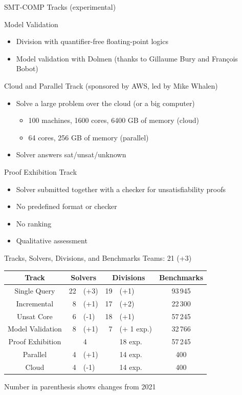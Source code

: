 \documentclass[table]{beamer}
\def\emph#1{\textcolor{MYblue}{#1}}
\begin{document}
\begin{frame}[fragile]{SMT-COMP Tracks (experimental)}

  \emph{Model Validation}
  \begin{itemize}
    \item Division with quantifier-free floating-point logics
    \item Model validation with Dolmen (thanks to Gillaume Bury and Fran\c{c}ois
    Bobot)
  \end{itemize}
  \bigskip

  \emph{Cloud and Parallel Track} (sponsored by AWS, led by Mike Whalen)
  \begin{itemize}
  \item Solve a large problem over the cloud (or a big computer)
  \begin{itemize}
    \item 100 machines, 1600 cores, 6400 GB of memory (cloud)
    \item 64 cores, 256 GB of memory (parallel)
  \end{itemize}
  \item Solver answers sat/unsat/unknown
  \end{itemize}

  \pause\bigskip

  \emph{Proof Exhibition Track}
  \begin{itemize}
  \item Solver submitted together with a checker for unsatisfiability proofs
  \item No predefined format or checker
  \item No ranking
  \item Qualitative assessment
  \end{itemize}

\end{frame}


\begin{frame}{Tracks, Solvers, Divisions, and Benchmarks}
  Teams: 21 (+3)
  \bigskip

  \begin{tabular}{c|r@{}l|r@{}l|c}
    Track & \multicolumn{2}{c|}{Solvers} & \multicolumn{2}{c|}{Divisions}  & Benchmarks \\
    \hline
    Single Query  &  22&(+3)  & 19&(+1)  & 93\,945 \\
    Incremental &  8&(+1)   & 17&(+2)  & 22\,300   \\
    Unsat Core  &  6&(-1)   & 18&(+1)  & 57\,245  \\
    Model Validation  &  8&(+1)    &  7& (+ 1 exp.)  & 32\,766  \\
    Proof Exhibition  &  &4    &  & 18 exp.  & 57\,245  \\
    \hline
    Parallel &   4&(+1)      &   &14 exp.  & 400 \\
    Cloud & 4&(-1)      &  &14 exp.  & 400 \\

  \end{tabular}
  \bigskip

  Number in parenthesis shows changes from 2021
\end{frame}
\end{document}
